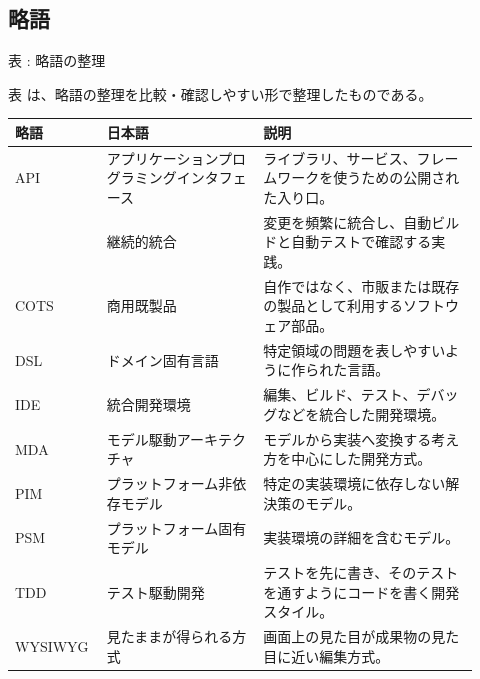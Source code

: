 \subsection*{略語}

\par\smallskip\noindent{}\label{tab:ch04-02}表 \thetable: 略語の整理\par\smallskip
表 \thetable は、略語の整理を比較・確認しやすい形で整理したものである。\par\smallskip
\begin{longtable}{L{0.16\linewidth}L{0.32\linewidth}L{0.44\linewidth}}
\toprule
略語 & 日本語 & 説明 \\
\midrule
API & アプリケーションプログラミングインタフェース & ライブラリ、サービス、フレームワークを使うための公開された入り口。 \\
 & 継続的統合 & 変更を頻繁に統合し、自動ビルドと自動テストで確認する実践。 \\
COTS & 商用既製品 & 自作ではなく、市販または既存の製品として利用するソフトウェア部品。 \\
DSL & ドメイン固有言語 & 特定領域の問題を表しやすいように作られた言語。 \\
IDE & 統合開発環境 & 編集、ビルド、テスト、デバッグなどを統合した開発環境。 \\
MDA & モデル駆動アーキテクチャ & モデルから実装へ変換する考え方を中心にした開発方式。 \\
PIM & プラットフォーム非依存モデル & 特定の実装環境に依存しない解決策のモデル。 \\
PSM & プラットフォーム固有モデル & 実装環境の詳細を含むモデル。 \\
TDD & テスト駆動開発 & テストを先に書き、そのテストを通すようにコードを書く開発スタイル。 \\
WYSIWYG & 見たままが得られる方式 & 画面上の見た目が成果物の見た目に近い編集方式。 \\
\bottomrule
\end{longtable}
